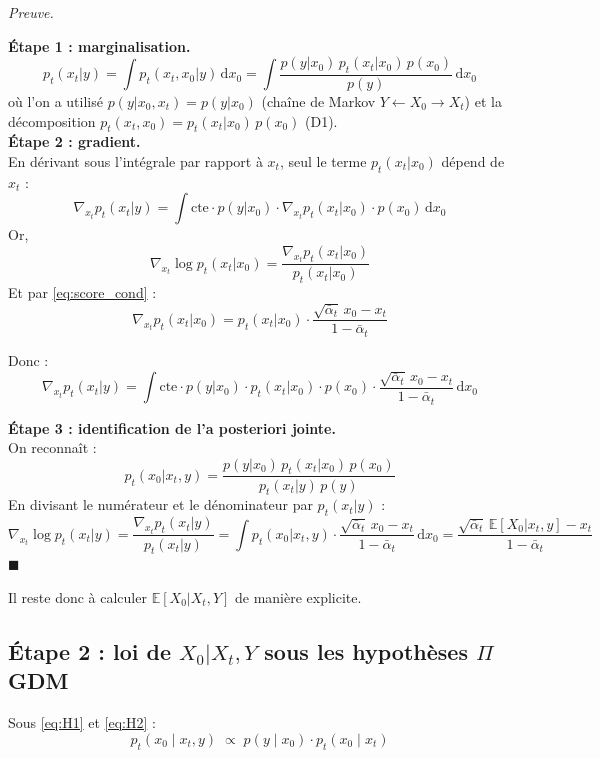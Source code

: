\documentclass[12pt]{article}
\renewcommand{\qedsymbol}{$\blacksquare$}
\renewenvironment{proof}[1][\proofname]{%
  \par\medskip\noindent
  \textit{\color{proofgray}#1.}\enspace\ignorespaces
}{\hfill\qedsymbol\par\medskip}
\renewcommand{\proofname}{Preuve}
\begin{document}
 \begin{proof}



\textbf{Étape 1 : marginalisation.}
\[
p_t(x_t | y) = \int p_t(x_t, x_0 | y)\, \mathrm{d}x_0 = \int \frac{p(y | x_0)\, p_t(x_t | x_0)\, p(x_0)}{p(y)}\, \mathrm{d}x_0
\]
où l'on a utilisé $p(y | x_0, x_t) = p(y | x_0)$ (chaîne de Markov $Y \leftarrow X_0 \to X_t$) et la décomposition $p_t(x_t, x_0) = p_t(x_t | x_0)\, p(x_0)$ (D1).\\

\textbf{Étape 2 : gradient.} \\
En dérivant sous l'intégrale par rapport à $x_t$, seul le terme $p_t(x_t | x_0)$ dépend de $x_t$ :
\[
\nabla_{x_t} p_t(x_t | y) = \int \text{cte} \cdot p(y | x_0) \cdot \nabla_{x_t} p_t(x_t | x_0) \cdot p(x_0)\, \mathrm{d}x_0
\]
Or, \[\nabla_{x_t} \log p_t(x_t | x_0)=\frac{\nabla_{x_t} p_t(x_t | x_0)}{ p_t(x_t | x_0)}\] 
Et par \eqref{eq:score_cond} : 
\[\nabla_{x_t} p_t(x_t | x_0) = p_t(x_t | x_0) \cdot \frac{\sqrt{\bar\alpha_t}\, x_0 - x_t}{1 - \bar\alpha_t}\] 

Donc :
\[
\nabla_{x_t} p_t(x_t | y) = \int \text{cte} \cdot p(y | x_0) \cdot p_t(x_t | x_0) \cdot p(x_0) \cdot \frac{\sqrt{\bar\alpha_t}\, x_0 - x_t}{1 - \bar\alpha_t}\, \mathrm{d}x_0
\]

\textbf{Étape 3 : identification de l'a posteriori jointe.}\\
 On reconnaît :
\[
p_t(x_0 | x_t, y) = \frac{p(y | x_0)\, p_t(x_t | x_0)\, p(x_0)}{p_t(x_t | y)\, p(y)}
\]
En divisant le numérateur et le dénominateur par $p_t(x_t | y)$ :
\[
\nabla_{x_t} \log p_t(x_t | y) = \frac{\nabla_{x_t} p_t(x_t | y)}{p_t(x_t | y)} = \int p_t(x_0 | x_t, y) \cdot \frac{\sqrt{\bar\alpha_t}\, x_0 - x_t}{1 - \bar\alpha_t}\, \mathrm{d}x_0 = \frac{\sqrt{\bar\alpha_t}\, \mathbb{E}[X_0 | x_t, y] - x_t}{1 - \bar\alpha_t}
\]
\end{proof}

Il reste donc à calculer $\mathbb{E}[X_0 | X_t, Y]$ de manière explicite.


\subsection{Étape 2 : loi de $X_0 | X_t, Y$ sous les hypothèses $\Pi$GDM}

\begin{propositionbox}
\label{prop:posterior_joint}
Sous \ref{eq:H1} et \ref{eq:H2} :
\begin{equation}
    p_t(x_0 \mid x_t, y) \;\propto\; p(y \mid x_0) \cdot p_t(x_0 \mid x_t)
    \label{eq:posterior_prop}
\end{equation}
\end{propositionbox}
\end{document}
